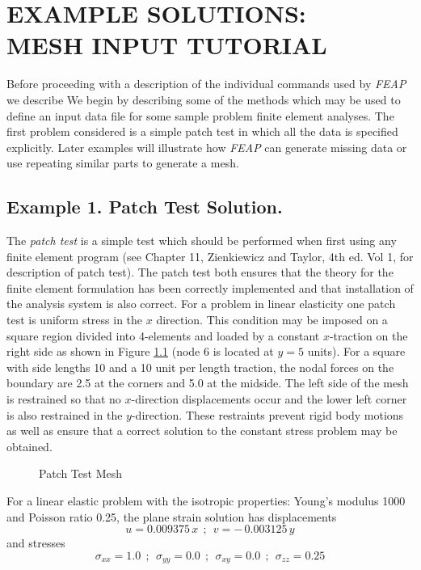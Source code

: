\chapter[Example Solutions]{EXAMPLE SOLUTIONS: \\ MESH INPUT TUTORIAL}
\label{examples}

Before proceeding with a description of the individual commands used by
{\sl FEAP} we describe 
We begin by describing
some of the methods which may be used to
define an input data file for some sample problem finite element analyses.
The first problem considered is a simple patch test in which all
the data is specified explicitly.  Later examples will illustrate how
{\sl FEAP} can generate missing data or use repeating similar parts to generate
a mesh.

\section{Example 1.  Patch Test Solution.}
\label{ex1}

The {\it patch test} is a
simple test which should be performed when first using any finite element
program 
(see Chapter 11, Zienkiewicz and Taylor, 4th ed. Vol 1, for description
of patch test). The patch test
both ensures that the theory for the finite element formulation has been
correctly implemented and that installation of the analysis
system is also correct.  For a problem in linear elasticity one patch test
is uniform stress in the $x$ direction.  This condition may be
imposed on a square region divided into 4-elements and loaded by a constant
$x$-traction on the right side as shown in Figure \ref{fig1} (node 6 is
located at $y = 5$ units).  For a square
with side lengths 10 and a 10 unit
per length traction, the nodal forces on the boundary are 2.5 at the corners
and 5.0 at the midside.  The left side of the mesh is restrained so that
no $x$-direction displacements occur and the lower left corner is also
restrained in the $y$-direction.  These restraints prevent rigid body
motions as well as ensure that a correct solution to the constant stress
problem may be obtained.

\begin{figure}[ht!]
\epsfysize=2.3in
\centerline {\hfil {} \hfil}
\caption{Patch Test Mesh}
\label{fig1}
\end{figure}
For  a linear elastic problem with the isotropic properties: Young's modulus
1000 and Poisson ratio 0.25, the plane strain solution has
displacements
$$ u = 0.009375 \, x  ~~;~~ v = - \, 0.003125 \, y$$
and stresses
$$ \sigma_{xx} = 1.0  ~~;~~ \sigma_{yy} = 0.0 ~~;~~ \sigma_{xy} = 0.0 ~~;~~
\sigma_{zz} = 0.25$$

